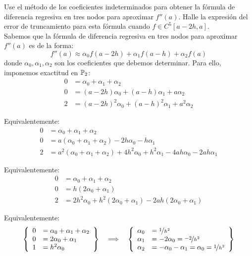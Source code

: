 \begin{ejercicio}\label{ej:2.1.5}
    Use el método de los coeficientes indeterminados para obtener la fórmula de diferencia regresiva en tres nodos para aproximar $f''(a)$. Halle la expresión del error de truncamiento para esta fórmula cuando $f \in C^5[a - 2h, a]$.\\
    
    Sabemos que la fórmula de diferencia regresiva en tres nodos para aproximar $f''(a)$ es de la forma:
    \[
    f''(a) \approx \alpha_0 f(a - 2h) + \alpha_1 f(a - h) + \alpha_2 f(a)
    \]
    donde $\alpha_0, \alpha_1, \alpha_2$ son los coeficientes que debemos determinar. Para ello, imponemos exactitud en $\mathbb{P}_2$:
    \begin{align*}
        0 &= \alpha_0 + \alpha_1 + \alpha_2\\
        0 &= (a-2h)\alpha_0 + (a-h)\alpha_1 + a\alpha_2\\
        2 &= (a-2h)^2\alpha_0 + (a-h)^2\alpha_1 + a^2\alpha_2
    \end{align*}

    Equivalentemente:
    \begin{align*}
        0 &= \alpha_0 + \alpha_1 + \alpha_2\\
        0 &= a\left(\alpha_0 + \alpha_1 + \alpha_2\right) - 2h\alpha_0 - h\alpha_1\\
        2 &= a^2\left(\alpha_0 + \alpha_1 + \alpha_2\right) +4h^2\alpha_0 + h^2\alpha_1 - 4ah\alpha_0 - 2ah\alpha_1
    \end{align*}

    Equivalentemente:
    \begin{align*}
        0 &= \alpha_0 + \alpha_1 + \alpha_2\\
        0 &= h(2\alpha_0 + \alpha_1)\\
        2 &= 2h^2\alpha_0 + h^2(2\alpha_0+\alpha_1) -2ah(2\alpha_0+\alpha_1)
    \end{align*}

    Equivalentemente:
    \begin{equation*}
        \left\{
            \begin{array}{rl}
                0 &= \alpha_0 + \alpha_1 + \alpha_2\\
                0 &= 2\alpha_0 + \alpha_1\\
                1 &= h^2\alpha_0
            \end{array}
        \right\}
        \quad\Longrightarrow\quad
        \left\{
            \begin{array}{rl}
                \alpha_0 &= \nicefrac{1}{h^2}\\
                \alpha_1 &= -2\alpha_0 = \nicefrac{-2}{h^2}\\
                \alpha_2 &= -\alpha_0 - \alpha_1 = \alpha_0 = \nicefrac{1}{h^2}
            \end{array}
        \right\}
    \end{equation*}


\end{ejercicio}
